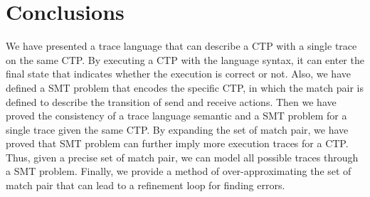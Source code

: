 \section{Conclusions}
We have presented a trace language that can describe a CTP with a single trace on the same CTP. By executing a CTP with the language syntax, it can enter the final state that indicates whether the execution is correct or not. Also, we have defined a SMT problem that encodes the specific CTP, in which the match pair is defined to describe the transition of send and receive actions. Then we have proved the consistency of a trace language semantic and a SMT problem for a single trace given the same CTP. By expanding the set of match pair, we have proved that SMT problem can further imply more execution traces for a CTP. Thus, given a precise set of match pair, we can model all possible traces through a SMT problem. Finally, we provide a method of over-approximating the set of match pair that can lead to a refinement loop for finding errors.  